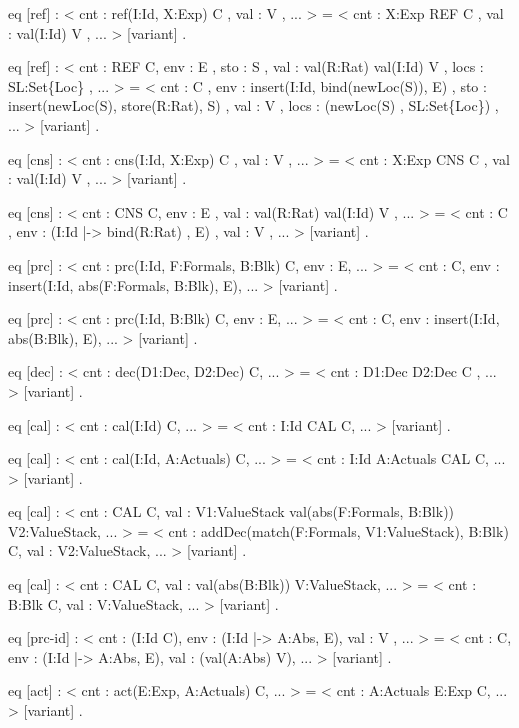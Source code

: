 \documentclass{llncs}%
\begin{document}
    eq [ref] :
        < cnt : ref(I:Id, X:Exp) C , val : V , ... > =
        < cnt : X:Exp REF C , val : val(I:Id) V , ... > [variant] .

    eq [ref] :
        < cnt : REF C, env : E ,
          sto : S ,
          val : val(R:Rat) val(I:Id) V ,
          locs : SL:Set\{Loc\} , ... > 
     =
        < cnt : C ,
          env : insert(I:Id, bind(newLoc(S)), E) ,
          sto : insert(newLoc(S), store(R:Rat), S) ,
          val : V ,
          locs : (newLoc(S) , SL:Set\{Loc\}) , ... > [variant] .

    eq [cns] :
        < cnt : cns(I:Id, X:Exp) C , val : V , ... > =
        < cnt : X:Exp CNS C , val : val(I:Id) V , ... > [variant] .

    eq [cns] :
        < cnt : CNS C, env : E , val : val(R:Rat) val(I:Id) V , ... > =
        < cnt : C ,
          env : (I:Id |-> bind(R:Rat) , E) ,
          val : V , ... > [variant] .

    eq [prc] :
        < cnt : prc(I:Id, F:Formals, B:Blk) C, env : E, ... > =
        < cnt : C,
          env : insert(I:Id, abs(F:Formals, B:Blk), E), ... > [variant] .

    eq [prc] :
        < cnt : prc(I:Id, B:Blk) C, env : E, ... > =
        < cnt : C,
          env : insert(I:Id, abs(B:Blk), E), ... > [variant] .

    eq [dec] :
        < cnt : dec(D1:Dec, D2:Dec) C, ... > =
        < cnt : D1:Dec D2:Dec C , ... > [variant] .

    eq [cal] :
        < cnt : cal(I:Id) C, ... > =
        < cnt : I:Id CAL C, ... > [variant] .

    eq [cal] :
        < cnt : cal(I:Id, A:Actuals) C, ... > =
        < cnt : I:Id A:Actuals CAL C, ... > [variant] .

    eq [cal] :
        < cnt : CAL C,
          val : V1:ValueStack
          val(abs(F:Formals, B:Blk)) V2:ValueStack, ... > =
        < cnt : addDec(match(F:Formals, V1:ValueStack), B:Blk) C,
          val : V2:ValueStack, ... > [variant] .

    eq [cal] :
        < cnt : CAL C,
          val : val(abs(B:Blk)) V:ValueStack, ... > =
        < cnt : B:Blk C,
          val : V:ValueStack, ... > [variant] .

    eq [prc-id] :
        < cnt : (I:Id C),
          env : (I:Id |-> A:Abs, E),
          val : V , ... > =
        < cnt : C,
          env : (I:Id |-> A:Abs, E),
          val : (val(A:Abs) V), ... > [variant] .

    eq [act] :
        < cnt : act(E:Exp, A:Actuals) C, ... > =
        < cnt : A:Actuals E:Exp C, ... > [variant] .
\end{document}
